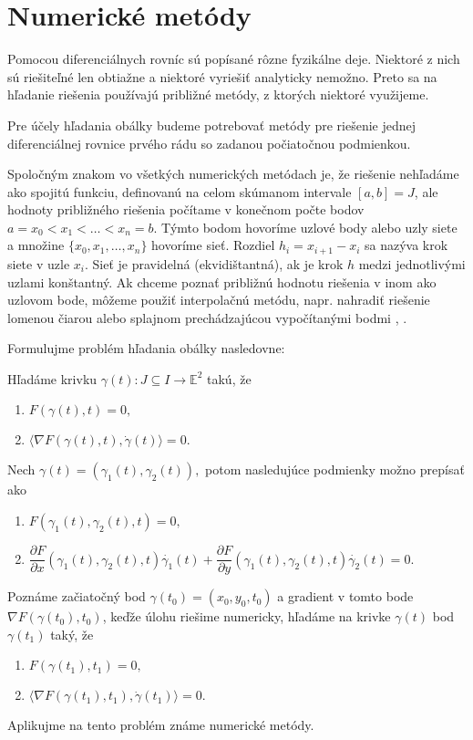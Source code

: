 \chapter{Numerické metódy}
Pomocou diferenciálnych rovníc sú popísané rôzne fyzikálne deje. Niektoré z nich sú riešiteľné len obtiažne a niektoré vyriešiť analyticky nemožno. Preto sa na hľadanie riešenia používajú približné metódy, z ktorých niektoré využijeme. 

Pre účely hľadania obálky budeme potrebovať metódy pre riešenie jednej diferenciálnej rovnice prvého rádu so zadanou počiatočnou podmienkou. 

Spoločným znakom vo všetkých numerických metódach je, že riešenie nehľadáme ako spojitú funkciu, definovanú na celom skúmanom intervale $[a, b] = J$, ale  hodnoty približného riešenia počítame v konečnom počte bodov $ a = x_0 < x_1 < \dots < x_n = b.$ Týmto bodom hovoríme uzlové body alebo uzly siete a množine $\{x_0, x_1, \dots, x_n\}$ hovoríme sieť. Rozdiel $h_i = x_{i+1} - x_{i}$ sa nazýva krok siete v uzle $x_i.$ Sieť je pravidelná (ekvidištantná), ak je krok $h$ medzi jednotlivými uzlami konštantný. Ak chceme poznať približnú hodnotu riešenia v inom ako uzlovom bode, môžeme použiť interpolačnú metódu, napr. nahradiť riešenie lomenou čiarou alebo splajnom prechádzajúcou vypočítanými bodmi \cite{Hla}, \cite{Bab00}.

Formulujme problém hľadania obálky nasledovne:

Hľadáme krivku $\gamma(t) \colon J \subseteq I \rightarrow \mathbb{E}^{2} $ takú, že 
\begin{enumerate}
\item $F(\gamma(t), t) = 0, $ 
\item $\langle \nabla F(\gamma(t), t), \dot{\gamma}(t) \rangle = 0.$
\end{enumerate}
Nech $\gamma(t) = (\gamma_{1}(t), \gamma_{2}(t)), $ potom nasledujúce podmienky možno prepísať ako
\begin{enumerate}
\item $F(\gamma_{1}(t), \gamma_{2}(t), t) = 0, $ 
\item $\dfrac{\partial F}{\partial x} (\gamma_1 (t), \gamma_2 (t), t) \dot{\gamma_{1}}(t) + \dfrac{\partial F}{\partial y}(\gamma_1 (t), \gamma_2 (t), t) \dot{\gamma_{2}}(t) = 0.$
\end{enumerate}
Poznáme začiatočný bod $ \gamma (t_0) =(x_0, y_0, t_0) $ a gradient v tomto bode $ \nabla F (\gamma (t_0), t_{0})$, keďže úlohu riešime numericky, hľadáme na krivke $\gamma(t)$ bod $\gamma(t_1)$ taký, že
\begin{enumerate}
\item $F(\gamma(t_{1}), t_{1}) = 0, $ 
\item $\langle \nabla F(\gamma(t_{1}), t_{1}), \dot{\gamma}(t_{1}) \rangle = 0.$
\end{enumerate}
Aplikujme na tento problém známe numerické metódy.

